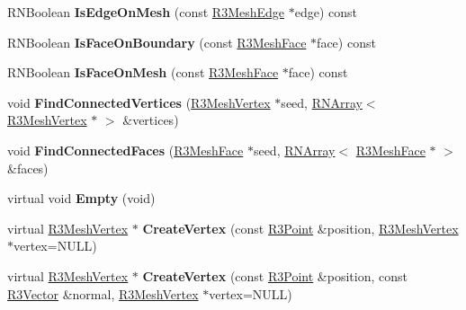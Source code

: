 \begin{DoxyCompactItemize}
\item 
R\+N\+Boolean {\bfseries Is\+Edge\+On\+Mesh} (const \hyperlink{class_r3_mesh_edge}{R3\+Mesh\+Edge} $\ast$edge) const \hypertarget{class_r3_mesh_ab6e954ded962c00e7fe289d285c69144}{}\label{class_r3_mesh_ab6e954ded962c00e7fe289d285c69144}

\item 
R\+N\+Boolean {\bfseries Is\+Face\+On\+Boundary} (const \hyperlink{class_r3_mesh_face}{R3\+Mesh\+Face} $\ast$face) const \hypertarget{class_r3_mesh_ac99078e7dda8967f1c400bb398457851}{}\label{class_r3_mesh_ac99078e7dda8967f1c400bb398457851}

\item 
R\+N\+Boolean {\bfseries Is\+Face\+On\+Mesh} (const \hyperlink{class_r3_mesh_face}{R3\+Mesh\+Face} $\ast$face) const \hypertarget{class_r3_mesh_a482d4500df6f88e2920aa821be3b2c52}{}\label{class_r3_mesh_a482d4500df6f88e2920aa821be3b2c52}

\item 
void {\bfseries Find\+Connected\+Vertices} (\hyperlink{class_r3_mesh_vertex}{R3\+Mesh\+Vertex} $\ast$seed, \hyperlink{class_r_n_array}{R\+N\+Array}$<$ \hyperlink{class_r3_mesh_vertex}{R3\+Mesh\+Vertex} $\ast$ $>$ \&vertices)\hypertarget{class_r3_mesh_aa36acbf83641634952104257e6fe0586}{}\label{class_r3_mesh_aa36acbf83641634952104257e6fe0586}

\item 
void {\bfseries Find\+Connected\+Faces} (\hyperlink{class_r3_mesh_face}{R3\+Mesh\+Face} $\ast$seed, \hyperlink{class_r_n_array}{R\+N\+Array}$<$ \hyperlink{class_r3_mesh_face}{R3\+Mesh\+Face} $\ast$ $>$ \&faces)\hypertarget{class_r3_mesh_a39b6d386ad1fd9a96c5556db25e4caeb}{}\label{class_r3_mesh_a39b6d386ad1fd9a96c5556db25e4caeb}

\item 
virtual void {\bfseries Empty} (void)\hypertarget{class_r3_mesh_af64bd0da707834746e09ce9b30a92184}{}\label{class_r3_mesh_af64bd0da707834746e09ce9b30a92184}

\item 
virtual \hyperlink{class_r3_mesh_vertex}{R3\+Mesh\+Vertex} $\ast$ {\bfseries Create\+Vertex} (const \hyperlink{class_r3_point}{R3\+Point} \&position, \hyperlink{class_r3_mesh_vertex}{R3\+Mesh\+Vertex} $\ast$vertex=N\+U\+LL)\hypertarget{class_r3_mesh_a825dd6d024ba2b1466a33d0a8166a7dd}{}\label{class_r3_mesh_a825dd6d024ba2b1466a33d0a8166a7dd}

\item 
virtual \hyperlink{class_r3_mesh_vertex}{R3\+Mesh\+Vertex} $\ast$ {\bfseries Create\+Vertex} (const \hyperlink{class_r3_point}{R3\+Point} \&position, const \hyperlink{class_r3_vector}{R3\+Vector} \&normal, \hyperlink{class_r3_mesh_vertex}{R3\+Mesh\+Vertex} $\ast$vertex=N\+U\+LL)\hypertarget{class_r3_mesh_acadfcade618646149bf7f398f1066045}{}\label{class_r3_mesh_acadfcade618646149bf7f398f1066045}


\end{DoxyCompactItemize}
